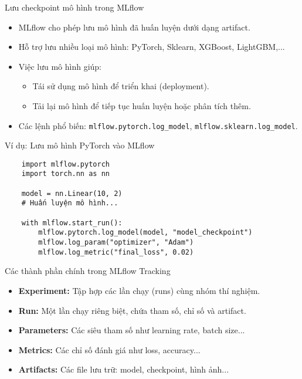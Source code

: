 \documentclass{beamer}
\begin{document}
\begin{frame}{Lưu checkpoint mô hình trong MLflow}
    \begin{itemize}
        \item MLflow cho phép lưu mô hình đã huấn luyện dưới dạng artifact.
        \item Hỗ trợ lưu nhiều loại mô hình: PyTorch, Sklearn, XGBoost, LightGBM,...
        \item Việc lưu mô hình giúp:
        \begin{itemize}
            \item Tái sử dụng mô hình để triển khai (deployment).
            \item Tải lại mô hình để tiếp tục huấn luyện hoặc phân tích thêm.
        \end{itemize}
        \item Các lệnh phổ biến: \texttt{mlflow.pytorch.log\_model}, \texttt{mlflow.sklearn.log\_model}.
    \end{itemize}
\end{frame}

\begin{frame}[fragile]{Ví dụ: Lưu mô hình PyTorch vào MLflow}
    \begin{verbatim}
    import mlflow.pytorch
    import torch.nn as nn
    
    model = nn.Linear(10, 2)
    # Huấn luyện mô hình...
    
    with mlflow.start_run():
        mlflow.pytorch.log_model(model, "model_checkpoint")
        mlflow.log_param("optimizer", "Adam")
        mlflow.log_metric("final_loss", 0.02)
    \end{verbatim}
\end{frame}
    
\begin{frame}{Các thành phần chính trong MLflow Tracking}
    \begin{itemize}
        \item \textbf{Experiment:} Tập hợp các lần chạy (runs) cùng nhóm thí nghiệm.
        \item \textbf{Run:} Một lần chạy riêng biệt, chứa tham số, chỉ số và artifact.
        \item \textbf{Parameters:} Các siêu tham số như learning rate, batch size...
        \item \textbf{Metrics:} Các chỉ số đánh giá như loss, accuracy...
        \item \textbf{Artifacts:} Các file lưu trữ: model, checkpoint, hình ảnh...
    \end{itemize}
\end{frame}
    
\end{document}
